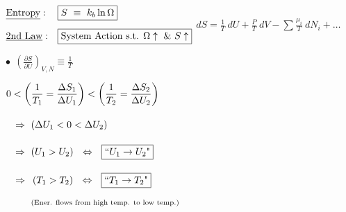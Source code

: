 \documentclass[12pt]{article}
\begin{document}
\(\begin{aligned}
    &\text{\underline{Entropy}}:&& \boxed{ S \ \equiv\ k_b \ln{\Omega} }\\[5pt]
    &\text{\underline{2nd Law}}:&& \boxed{ \text{System Action s.t. } \Omega \uparrow \ \text{\&} \ S \uparrow }
\end{aligned}\)
\indent\indent\(\boxed{ dS = \frac{1}{T} \ dU + \frac{P}{T} \ dV - \sum \frac{\mu_i}{T} \ dN_i + \dots}\) 

\vspace{10pt}\noindent
\begin{minipage}[t]{.49\textwidth}
    \setlength{\parindent}{.5cm}
    \noindent
    \(\displaystyle \bullet\ \ \boxed{ \left( \frac{\partial S}{\partial U} \right)_{V,N} \equiv \frac{1}{T} }\)

    \vspace{15pt}
    \indent\(\begin{aligned}[t]
        &0 < \left( \frac{1}{T_1} = \frac{\Delta S_1}{\Delta U_1} \right)
            < \left( \frac{1}{T_2} = \frac{\Delta S_2}{\Delta U_2} \right)\\[10pt]
        &\ \ \Rightarrow \ \left( \Delta U_1 < 0 < \Delta U_2 \right)\\[10pt]
        &\ \ \Rightarrow \ \left( U_1 > U_2 \right) 
            \ \ \Leftrightarrow \ \ \boxed{ \text{``} U_1 \rightarrow U_2 \text{"} }\\[10pt]
        &\ \ \Rightarrow \ \begin{aligned}[t]
            &\left( T_1 > T_2 \right) 
                \ \ \Leftrightarrow \ \ \boxed{ \text{``} T_1 \rightarrow T_2 \text{"} }\\[5pt]
            &\text{\scriptsize(Ener. flows from high temp. to low temp.)}
        \end{aligned}
    \end{aligned}\)    
\end{minipage} 
\end{document}
